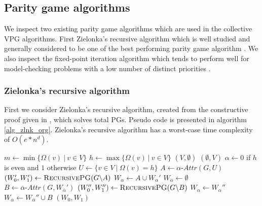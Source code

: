 \subsection{Parity game algorithms}
We inspect two existing parity game algorithms which are used in the collective VPG algorithms. First Zielonka's recursive algorithm which is well studied and generally considered to be one of the best performing parity game algorithm \cite{Oink,SolvingPGInPractice}. We also inspect the fixed-point iteration algorithm which tends to perform well for model-checking problems with a low number of distinct priorities \cite{BDDSolvingPG}.

\subsubsection{Zielonka's recursive algorithm}
First we consider Zielonka's recursive algorithm, created from the constructive proof given in \cite{ZIELONKA1998135}, which solves total PGs. Pseudo code is presented in algorithm \ref{alg_zlnk_org}. Zielonka's recursive algorithm has a worst-case time complexity of $O(e*n^d)$.
\begin{algorithm}
	\caption{$\textsc{RecursivePG}(\textit{PG } G = (V,V_0,V_1, E, \Omega))$}
	\label{alg_zlnk_org}
	\begin{algorithmic}[1]
		\State $m \gets \min\{ \Omega(v)\ |\ v \in V\}$
		\State $h \gets\max\{ \Omega(v)\ |\ v \in V\}$
		\State \Return $(V,\emptyset)$
		\Else
		\State \Return $(\emptyset, V)$
		\EndIf
		\EndIf
		\State $\alpha \gets 0$ if $h$ is even and $1$ otherwise
		\State $U \gets \{v \in V\ |\ \Omega(v) = h\}$
		\State $A \gets \alpha\textit{-Attr}(G, U)$
		\State $(W_0', W_1') \gets \textsc{RecursivePG}(G \backslash A)$
		\State $W_\alpha \gets A \cup W_\alpha'$
		\State $W_{\overline{\alpha}} \gets \emptyset$
		\Else
		\State $B \gets \overline{\alpha}\textit{-Attr}(G,W_{\overline{\alpha}}')$
		\State $(W_0'', W_1'') \gets \textsc{RecursivePG}(G \backslash B)$
		\State $W_\alpha \gets W_\alpha''$
		\State $W_{\overline{\alpha}} \gets W_{\overline{\alpha}}'' \cup B$
		\EndIf
		\State \Return $(W_0, W_1)$
	\end{algorithmic}
\end{algorithm}

